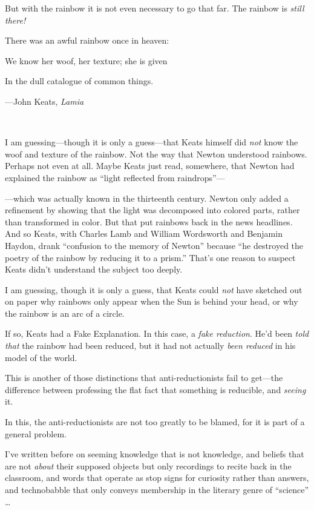 {
 But with the rainbow it is not even necessary to go that far. The
rainbow is \textit{still there!}}

\myendsectiontext


\bigskip


{
 There was an awful rainbow once in heaven:}

{
 We know her woof, her texture; she is given}

{
 In the dull catalogue of common things.}

{\raggedleft
 {}---John Keats, \textit{Lamia}
\par}


\bigskip

{
 ~}

{
 I am guessing---though it is only a guess---that Keats himself did
\textit{not} know the woof and texture of the rainbow. Not the way that
Newton understood rainbows. Perhaps not even at all. Maybe Keats just
read, somewhere, that Newton had explained the rainbow as
``light reflected from
raindrops''---}

{
 {}---which was actually known in the thirteenth century. Newton
only added a refinement by showing that the light was decomposed into
colored parts, rather than transformed in color. But that put rainbows
back in the news headlines. And so Keats, with Charles Lamb and William
Wordsworth and Benjamin Haydon, drank ``confusion to
the memory of Newton'' because ``he
destroyed the poetry of the rainbow by reducing it to a
prism.'' That's one reason to suspect
Keats didn't understand the subject too deeply.}

{
 I am guessing, though it is only a guess, that Keats could
\textit{not} have sketched out on paper why rainbows only appear when
the Sun is behind your head, or why the rainbow is an arc of a circle.}

{
 If so, Keats had a Fake Explanation. In this case, a \textit{fake
reduction}. He'd been \textit{told that} the rainbow
had been reduced, but it had not actually \textit{been reduced} in his
model of the world.}

{
 This is another of those distinctions that anti-reductionists fail
to get---the difference between professing the flat fact that something
is reducible, and \textit{seeing} it.}

{
 In this, the anti-reductionists are not too greatly to be blamed,
for it is part of a general problem.}

{
 I've written before on seeming knowledge that is
not knowledge, and beliefs that are not \textit{about} their supposed
objects but only recordings to recite back in the classroom, and words
that operate as stop signs for curiosity rather than answers, and
technobabble that only conveys membership in the literary genre of
``science'' \ldots}

